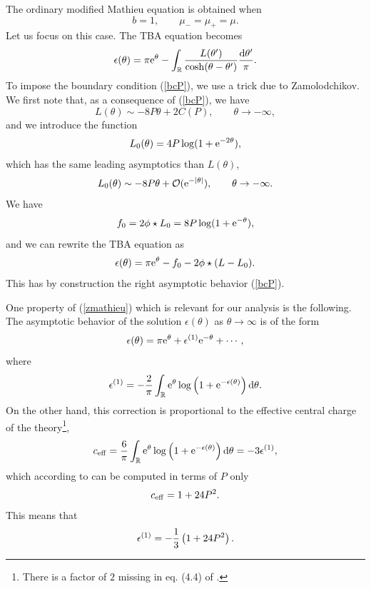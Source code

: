 \documentclass[a4paper,11pt]{article}
\theoremstyle{definition}
\newcommand{\CO}{{\cal O}}
\def\IR{{\mathbb R}}
\newcommand{\re}{{\rm e}}
\newcommand{\rd}{{\rm d}}
\def\IR{\mathbb{R}}
\begin{document}
The ordinary modified Mathieu equation is obtained when 
%
\begin{equation}
b=1, \qquad \mu_-=\mu_+=\mu. 
\end{equation}
%
Let us focus on this case. The TBA equation becomes
%
\begin{equation}
  \label{zmathieu}
  \epsilon (\theta)=\pi \re^{\theta}-\int_\IR {L(\theta') \over \cosh(\theta-\theta')} {\rd \theta' \over \pi}. 
\end{equation}
%
To impose the boundary condition (\ref{bcP}), we use a trick due to Zamolodchikov. We first note that, 
as a consequence of (\ref{bcP}), we have
%
\begin{equation}
  L(\theta) \sim -8 P \theta +2 C(P), \qquad \theta \rightarrow -\infty, 
\end{equation}
%
and we introduce the function
%
\begin{equation}
  L_0(\theta)= 4 P \log(1+ \re^{-2 \theta}), 
\end{equation}
%
which has the same leading asymptotics than $L(\theta)$, 
%
\begin{equation}
  L_0(\theta) \sim -8 P \theta + \CO(\re^{-|\theta|}), \qquad
  \theta\rightarrow -\infty.   
\end{equation}
%
We have
%
\begin{equation}
f_0=2\phi \star L_0 =8 P \log(1+ \re^{-\theta}), 
\end{equation}
%
and we can rewrite the TBA equation as 
%
\begin{equation}
\epsilon (\theta)= \pi \re^\theta -f_0 -2\phi\star(L-L_0). 
\end{equation}
%
This has by construction the right asymptotic behavior (\ref{bcP}). 

One property of (\ref{zmathieu}) which is relevant for our analysis is
the following. The asymptotic behavior of the solution
$\epsilon(\theta)$ as $\theta \rightarrow \infty$ is of the form
%
\begin{equation}
\epsilon(\theta)= \pi \re^{\theta} +\epsilon^{(1)} \re^{-\theta}+ \cdots, 
\end{equation}
%
where 
%
\begin{equation}
\epsilon^{(1)}=-{2 \over \pi} \int_\IR \re^\theta \log\left(1+\re^{-\epsilon(\theta)}\right) \rd \theta. 
\end{equation}
%
On the other hand, this correction is proportional to the effective
central charge of the theory\footnote{There is a factor of $2$ missing
  in eq. (4.4) of \cite{post-zamo}.},
%
\begin{equation}
c_{\rm eff}= {6 \over  \pi} \int_\IR \re^\theta \log\left(1+\re^{-\epsilon(\theta)}\right) \rd \theta=-3 \epsilon^{(1)} ,
\end{equation}
%
which according to \cite{post-zamo} can be computed in terms of $P$ only
%
\begin{equation}
\label{ceff}
c_{\rm eff}= 1+ 24 P^2. 
\end{equation}
%
This means that
%
\begin{equation}
\label{fqc}
\epsilon^{(1)}=-{1\over 3}\left(1+ 24 P^2 \right). 
\end{equation}







\linespread{0.6}
%
%

\end{document}
